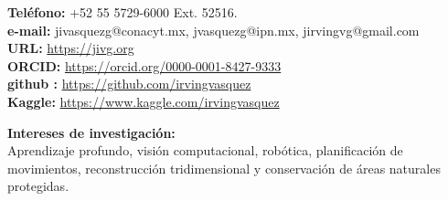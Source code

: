 \documentclass[10pt]{article}
\begin{document}
\begin{center}
\begin{minipage}[b]{0.6\linewidth}
\textbf{Teléfono:} +52 55 5729-6000 Ext. 52516. \\
\textbf{e-mail: \faEnvelopeO} jivasquezg@conacyt.mx, jvasquezg@ipn.mx, jirvingvg@gmail.com\\
\textbf{URL:} \url{https://jivg.org} \\
\textbf{ORCID:} \url{https://orcid.org/0000-0001-8427-9333} \\
\textbf{github \faGithub :} \url{https://github.com/irvingvasquez} \\
\textbf{Kaggle:} \url{https://www.kaggle.com/irvingvasquez} \\
\end{minipage}



\end{center}


\begin{center}
{\bf Intereses de investigación:} \\ Aprendizaje profundo, visión computacional, robótica, planificación de movimientos, reconstrucción tridimensional y conservación de áreas naturales protegidas. 
\end{center}
\end{document}
